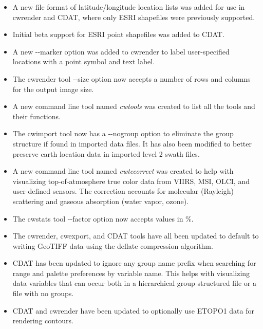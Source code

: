 \begin{itemize}

\item A new file format of latitude/longitude location lists was added 
for use in cwrender and CDAT, where only ESRI shapefiles were previously
supported.

\item Initial beta support for ESRI point shapefiles was added to CDAT.

\item A new -{-}marker option was added to cwrender to label user-specified
locations with a point symbol and text label.

\item The cwrender tool -{-}size option now accepts a number of rows and
columns for the output image size.

\item A new command line tool named {\em cwtools} was created to list all the 
tools and their functions.

\item The cwimport tool now has a -{-}nogroup option to eliminate the group
structure if found in imported data files.  It has also been modified to better
preserve earth location data in imported level 2 swath files.

\item A new command line tool named {\em cwtccorrect} was created to help
with visualizing top-of-atmosphere true color data from VIIRS, MSI, OLCI, 
and user-defined sensors. The correction accounts for molecular (Rayleigh) 
scattering and gaseous absorption (water vapor, ozone).

\item The cwstats tool -{-}factor option now accepts values in \%.

\item The cwrender, cwexport, and CDAT tools have all been updated to default
to writing GeoTIFF data using the deflate compression algorithm.

\item CDAT has been updated to ignore any group name prefix when searching for
range and palette preferences by variable name.  This helps with visualizing data 
variables that can occur both in a hierarchical group structured file or a 
file with no groups.

\item CDAT and cwrender have been updated to optionally use ETOPO1 data 
for rendering contours.

\end{itemize}

